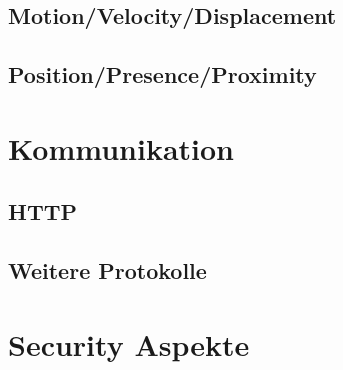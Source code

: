 \subsection{Motion/Velocity/Displacement}
\subsection{Position/Presence/Proximity}

\section{Kommunikation}
\subsection{HTTP}
\subsection{Weitere Protokolle}
\section{Security Aspekte}